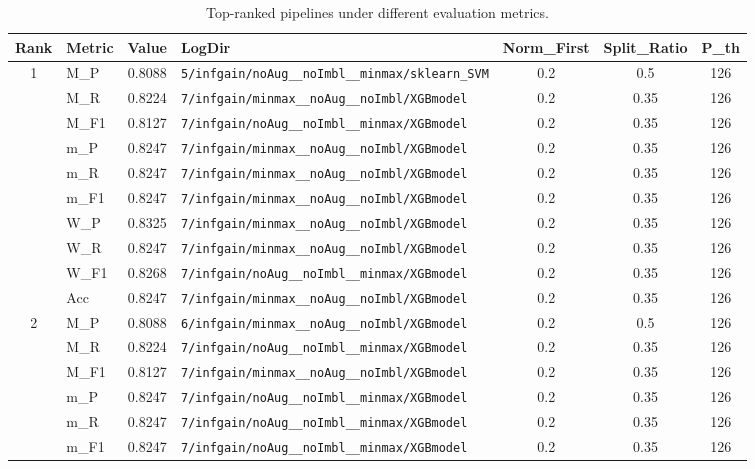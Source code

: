 \begin{table}[htbp]
\caption{Top-ranked pipelines under different evaluation metrics.}
\label{tab:rank_metric_vertical}
\centering
\small
\setlength{\tabcolsep}{4pt}
\begin{tabular}{|c|l|c|>{\ttfamily\footnotesize}p{7.2cm}|c|c|c|}
\hline
Rank & Metric & Value & LogDir & Norm\_First & Split\_Ratio & P\_th \\
\hline
\multirow{10}{*}{1} & M\_P & 0.8088 & \texttt{5/infgain/noAug\_\_noImbl\_\_minmax/sklearn\_SVM} & 0.2 & 0.5  & 126 \\ 
 & M\_R & 0.8224 & \texttt{7/infgain/minmax\_\_noAug\_\_noImbl/XGBmodel} & 0.2 & 0.35  & 126 \\ 
 & M\_F1 & 0.8127 & \texttt{7/infgain/noAug\_\_noImbl\_\_minmax/XGBmodel} & 0.2 & 0.35  & 126 \\ 
 & m\_P & 0.8247 & \texttt{7/infgain/minmax\_\_noAug\_\_noImbl/XGBmodel} & 0.2 & 0.35  & 126 \\ 
 & m\_R & 0.8247 & \texttt{7/infgain/minmax\_\_noAug\_\_noImbl/XGBmodel} & 0.2 & 0.35  & 126 \\ 
 & m\_F1 & 0.8247 & \texttt{7/infgain/minmax\_\_noAug\_\_noImbl/XGBmodel} & 0.2 & 0.35  & 126 \\ 
 & W\_P & 0.8325 & \texttt{7/infgain/minmax\_\_noAug\_\_noImbl/XGBmodel} & 0.2 & 0.35  & 126 \\ 
 & W\_R & 0.8247 & \texttt{7/infgain/minmax\_\_noAug\_\_noImbl/XGBmodel} & 0.2 & 0.35  & 126 \\ 
 & W\_F1 & 0.8268 & \texttt{7/infgain/noAug\_\_noImbl\_\_minmax/XGBmodel} & 0.2 & 0.35  & 126 \\ 
 & Acc & 0.8247 & \texttt{7/infgain/minmax\_\_noAug\_\_noImbl/XGBmodel} & 0.2 & 0.35  & 126 \\ 
\hline
\multirow{10}{*}{2} & M\_P & 0.8088 & \texttt{6/infgain/minmax\_\_noAug\_\_noImbl/XGBmodel} & 0.2 & 0.5  & 126 \\ 
 & M\_R & 0.8224 & \texttt{7/infgain/noAug\_\_noImbl\_\_minmax/XGBmodel} & 0.2 & 0.35  & 126 \\ 
 & M\_F1 & 0.8127 & \texttt{7/infgain/minmax\_\_noAug\_\_noImbl/XGBmodel} & 0.2 & 0.35  & 126 \\ 
 & m\_P & 0.8247 & \texttt{7/infgain/noAug\_\_noImbl\_\_minmax/XGBmodel} & 0.2 & 0.35  & 126 \\ 
 & m\_R & 0.8247 & \texttt{7/infgain/noAug\_\_noImbl\_\_minmax/XGBmodel} & 0.2 & 0.35  & 126 \\ 
 & m\_F1 & 0.8247 & \texttt{7/infgain/noAug\_\_noImbl\_\_minmax/XGBmodel} & 0.2 & 0.35  & 126 \\ 

\end{tabular}
\end{table}
